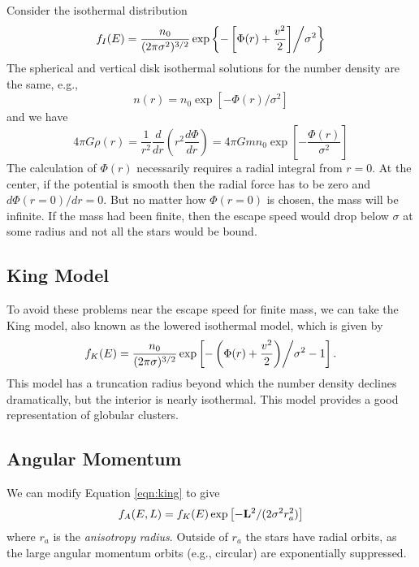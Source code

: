 \documentclass[]{article}
\begin{document}
Consider the isothermal distribution
\begin{equation}
f_{I}(E) = \frac{n_0}{(2\pi\sigma^2)^{3/2}}\exp\left\{-\left[\Phi(r) + \frac{v^2}{2}\right]\middle/\sigma^2\right\}
\end{equation}
\noindent
The spherical and vertical disk isothermal solutions for the number density are the same, e.g.,
\begin{equation}
n(r) = n_0 \exp\left[-\Phi(r)/\sigma^2\right]
\end{equation}
\noindent
and we have
\begin{equation}
4\pi G \rho(r) = \frac{1}{r^2} \frac{d}{d r}\left(r^2\frac{d\Phi}{dr}\right) = 4\pi G m n_0 \exp\left[-\frac{\Phi(r)}{\sigma^2}\right]
\end{equation}
\noindent
The calculation of $\Phi(r)$ necessarily requires a radial integral from $r=0$.  At the center,
if the potential is smooth then the radial force has to be zero and $d\Phi(r=0)/dr =0$.  But
no matter how $\Phi(r=0)$ is chosen, the mass will be infinite.  If the mass had been
finite, then the escape speed would drop below $\sigma$ at some radius and not all the stars 
would be bound.

\subsection{King Model}

To avoid these problems near the escape speed for finite mass, we can take the King model,
also known as the lowered isothermal model, which is given by
\begin{equation}
\label{eqn:king}
f_K(E) = \frac{n_0}{(2\pi\sigma)^{3/2}}\exp\left[-\left(\Phi(r) + \frac{v^2}{2}\right)\middle/\sigma^{2} - 1\right].
\end{equation}
\noindent
This model has a truncation radius beyond which the number density declines dramatically, but the interior is
nearly isothermal. This model provides a good representation of globular clusters.


\subsection{Angular Momentum}

We can modify Equation \ref{eqn:king} to give
\begin{equation}
f_A(E,L) = f_K(E)\exp\left[-\mathbf{L}^2/(2\sigma^2 r_a^2)\right]
\end{equation}
\noindent
where $r_a$ is the {\it anisotropy radius}.  Outside of $r_a$ the
stars have radial orbits, as the large angular momentum orbits (e.g.,
circular) are
exponentially suppressed.
\end{document}
